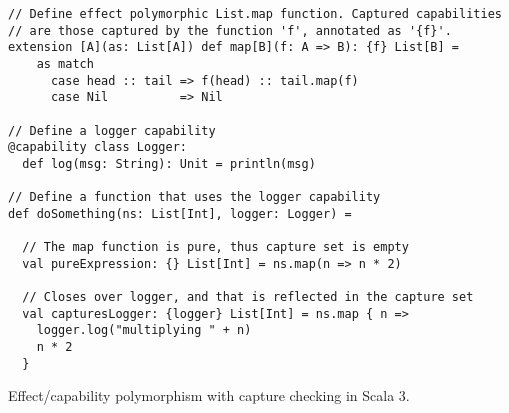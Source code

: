 \begin{algorithm}[ht]
\begin{verbatim}
// Define effect polymorphic List.map function. Captured capabilities
// are those captured by the function 'f', annotated as '{f}'.
extension [A](as: List[A]) def map[B](f: A => B): {f} List[B] =
    as match
      case head :: tail => f(head) :: tail.map(f)  
      case Nil          => Nil

// Define a logger capability
@capability class Logger:
  def log(msg: String): Unit = println(msg)

// Define a function that uses the logger capability
def doSomething(ns: List[Int], logger: Logger) =

  // The map function is pure, thus capture set is empty
  val pureExpression: {} List[Int] = ns.map(n => n * 2)

  // Closes over logger, and that is reflected in the capture set
  val capturesLogger: {logger} List[Int] = ns.map { n =>
    logger.log("multiplying " + n)
    n * 2
  }
\end{verbatim}

\caption{Effect/capability polymorphism with capture checking in Scala 3. \label{scala:cc-eff-polymorphism}}
\end{algorithm}
